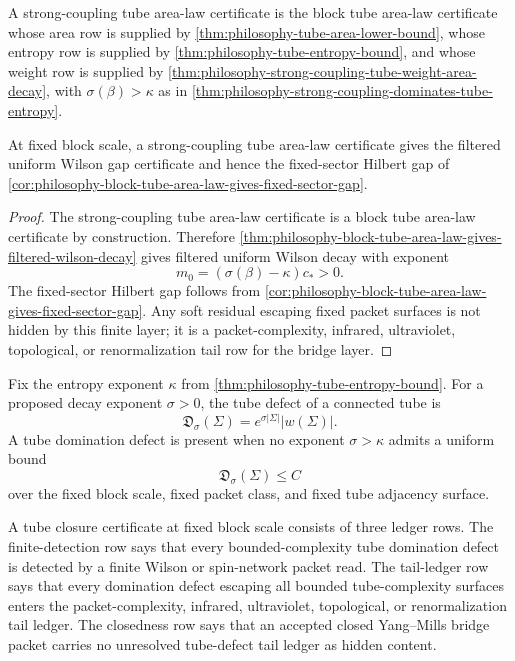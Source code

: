 \begin{definition}
\label{def:philosophy-strong-coupling-tube-area-law-certificate}
A strong-coupling tube area-law certificate is the block tube area-law
certificate whose area row is supplied by
\autoref{thm:philosophy-tube-area-lower-bound}, whose entropy row is supplied
by \autoref{thm:philosophy-tube-entropy-bound}, and whose weight row is
supplied by
\autoref{thm:philosophy-strong-coupling-tube-weight-area-decay}, with
$\sigma(\beta)>\kappa$ as in
\autoref{thm:philosophy-strong-coupling-dominates-tube-entropy}.
\end{definition}

\begin{theorem}
\label{thm:philosophy-strong-coupling-block-mass-gap-surface}
At fixed block scale, a strong-coupling tube area-law certificate gives the
filtered uniform Wilson gap certificate and hence the fixed-sector Hilbert
gap of \autoref{cor:philosophy-block-tube-area-law-gives-fixed-sector-gap}.
\end{theorem}
\begin{proof}
The strong-coupling tube area-law certificate is a block tube area-law
certificate by construction. Therefore
\autoref{thm:philosophy-block-tube-area-law-gives-filtered-wilson-decay}
gives filtered uniform Wilson decay with exponent
$$
m_0=(\sigma(\beta)-\kappa)c_{\ast}>0.
$$
The fixed-sector Hilbert gap follows from
\autoref{cor:philosophy-block-tube-area-law-gives-fixed-sector-gap}. Any
soft residual escaping fixed packet surfaces is not hidden by this finite
layer; it is a packet-complexity, infrared, ultraviolet, topological, or
renormalization tail row for the bridge layer.
\end{proof}

\begin{definition}
\label{def:philosophy-tube-domination-defect}
Fix the entropy exponent $\kappa$ from
\autoref{thm:philosophy-tube-entropy-bound}. For a proposed decay exponent
$\sigma>0$, the tube defect of a connected tube is
$$
\mathfrak D_{\sigma}(\Sigma)=e^{\sigma|\Sigma|}|w(\Sigma)|.
$$
A tube domination defect is present when no exponent $\sigma>\kappa$ admits
a uniform bound
$$
\mathfrak D_{\sigma}(\Sigma)\le C
$$
over the fixed block scale, fixed packet class, and fixed tube adjacency
surface.
\end{definition}

\begin{definition}
\label{def:philosophy-tube-closure-certificate}
A tube closure certificate at fixed block scale consists of three ledger
rows. The finite-detection row says that every bounded-complexity tube
domination defect is detected by a finite Wilson or spin-network packet
read. The tail-ledger row says that every domination defect escaping all
bounded tube-complexity surfaces enters the packet-complexity, infrared,
ultraviolet, topological, or renormalization tail ledger. The closedness row
says that an accepted closed Yang--Mills bridge packet carries no unresolved
tube-defect tail ledger as hidden content.
\end{definition}

